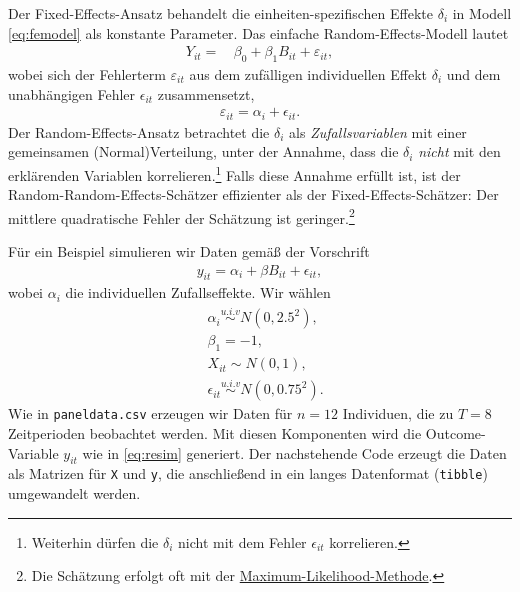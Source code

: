 \documentclass[
  a4paper,
  DIV=11,
  oneside]{scrreprt}
\begin{document}
Der Fixed-Effects-Ansatz behandelt die einheiten-spezifischen Effekte
\(\delta_i\) in Modell \eqref{eq:femodel} als konstante Parameter. Das
einfache Random-Effects-Modell lautet \begin{align*}
  Y_{it} =&\, \beta_0 + \beta_1 B_{it} + \varepsilon_{it},
\end{align*} wobei sich der Fehlerterm \(\varepsilon_{it}\) aus dem
zufälligen individuellen Effekt \(\delta_i\) und dem unabhängigen Fehler
\(\epsilon_{it}\) zusammensetzt, \begin{align*}
  \varepsilon_{it} = \alpha_i + \epsilon_{it}.
\end{align*} Der Random-Effects-Ansatz betrachtet die \(\delta_i\) als
\emph{Zufallsvariablen} mit einer gemeinsamen (Normal)Verteilung, unter
der Annahme, dass die \(\delta_i\) \emph{nicht} mit den erklärenden
Variablen korrelieren.\footnote{Weiterhin dürfen die \(\delta_i\) nicht
  mit dem Fehler \(\epsilon_{it}\) korrelieren.} Falls diese Annahme
erfüllt ist, ist der Random-Random-Effects-Schätzer effizienter als der
Fixed-Effects-Schätzer: Der mittlere quadratische Fehler der Schätzung
ist geringer.\footnote{Die Schätzung erfolgt oft mit der
  \href{https://de.wikipedia.org/wiki/Maximum-Likelihood-Methode}{Maximum-Likelihood-Methode}.}

Für ein Beispiel simulieren wir Daten gemäß der Vorschrift \begin{align}
  y_{it} = \alpha_i + \beta B_{it} + \epsilon_{it},\label{eq:resim}
\end{align} wobei \(\alpha_i\) die individuellen Zufallseffekte. Wir
wählen \begin{align*}
  & \alpha_i \overset{u.i.v}{\sim} N(0,2.5^2), \\
  & \beta_1 = -1,\\
  & X_{it} \sim N(0,1),\\
  & \epsilon_{it} \overset{u.i.v}{\sim} N(0,0.75^2).
\end{align*} Wie in \texttt{paneldata.csv} erzeugen wir Daten für
\(n=12\) Individuen, die zu \(T=8\) Zeitperioden beobachtet werden. Mit
diesen Komponenten wird die Outcome-Variable \(y_{it}\) wie in
\eqref{eq:resim} generiert. Der nachstehende Code erzeugt die Daten als
Matrizen für \texttt{X} und \texttt{y}, die anschließend in ein langes
Datenformat (\texttt{tibble}) umgewandelt werden.
\end{document}
